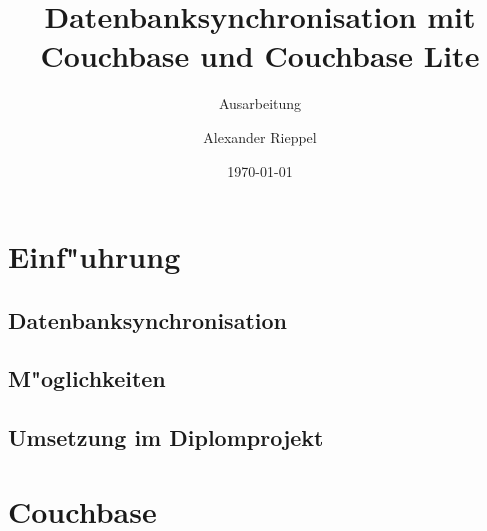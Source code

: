 \documentclass[a4paper,12pt]{scrreprt}
\begin{document}
\author{Alexander Rieppel} %
\title{Datenbanksynchronisation mit Couchbase und Couchbase Lite} %
\subject{VSDB} %
\subtitle{Ausarbeitung} %
\date{\today} %
\publishers{5AHITT} %

\maketitle
\tableofcontents


\chapter{Einf"uhrung}
\section{Datenbanksynchronisation}
\section{M"oglichkeiten}
\section{Umsetzung im Diplomprojekt}
\chapter{Couchbase}
\section{}
\end{document}
